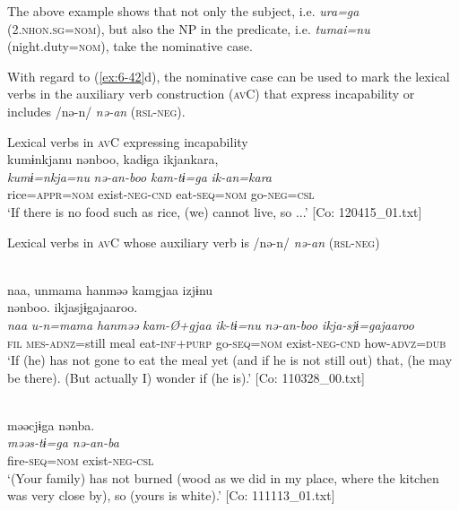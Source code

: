 The above example shows that not only the subject, i.e. \textit{ura=ga} (2.\textsc{nhon}.\textsc{sg}=\textsc{nom}), but also the NP in the predicate, i.e. \textit{tumai=nu} (night.duty=\textsc{nom}), take the nominative case.

  With regard to (\ref{ex:6-42}d), the nominative case can be used to mark the lexical verbs in the auxiliary verb construction (\textsc{av}C) that express incapability or includes /nə-n/ \textit{nə-an} (\textsc{rsl}-\textsc{neg}).

\ea\label{ex:6-48}
 Lexical verbs in \textsc{av}C expressing incapability\\

 \ea {\TM}  kumɨnkjanu  nənboo,  kadɨga  ikjankara,\\
\glll \textit{kumɨ=nkja=nu}  \textit{nə-an-boo}  \textit{kam-tɨ=ga}  \textit{ik-an=kara}\\
rice=\textsc{appr}=\textsc{nom}  exist-\textsc{neg}-\textsc{cnd}  eat-\textsc{seq}=\textsc{nom}  go-\textsc{neg}=\textsc{csl}\\
\glt ‘If there is no food such as rice, (we) cannot live, so ...’ [Co: 120415\_01.txt]
\z

  Lexical verbs in \textsc{av}C whose auxiliary verb is /nə-n/ \textit{nə-an} (\textsc{rsl}-\textsc{neg})

\ex{}\\
{\TM}
\glll  naa,  unmama  hanməə  kamgjaa  izjɨnu\\                                                                                        nənboo.  ikjasjɨgajaaroo.\\
      \textit{naa}  \textit{u-n=mama}  \textit{hanməə}  \textit{kam-Ø+gjaa}  \textit{ik-tɨ=nu}                                        \textit{nə-an-boo  ikja-sjɨ=gajaaroo}\\
      \textsc{fil}  \textsc{mes}-\textsc{adnz}=still  meal  eat-\textsc{inf}+\textsc{purp}  go-\textsc{seq}=\textsc{nom}              exist-\textsc{neg}-\textsc{cnd}  how-\textsc{advz}=\textsc{dub}\\
\glt ‘If (he) has not gone to eat the meal yet (and if he is not still out) that, (he may be there). (But actually I) wonder if (he is).’ [Co: 110328\_00.txt]
\z

\ex{}\\
{\TM}
\glll  məəcjɨga  nənba.\\
\textit{məəs-tɨ=ga}  \textit{nə-an-ba}\\
fire-\textsc{seq}=\textsc{nom}  exist-\textsc{neg}-\textsc{csl}\\
\glt ‘(Your family) has not burned (wood as we did in my place, where the kitchen was very close by), so (yours is white).’ [Co: 111113\_01.txt]
\z

